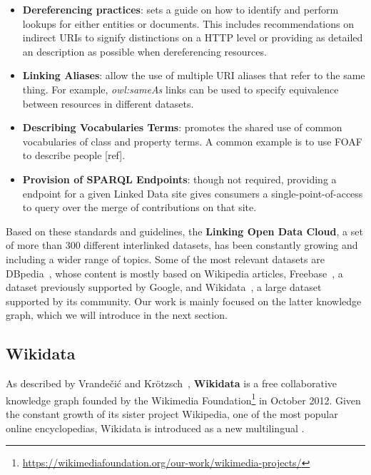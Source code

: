 \begin{itemize}
    \item \textbf{Dereferencing practices}: sets a guide on how to identify and perform lookups 
    for either entities or documents. This includes recommendations on indirect URIs to signify 
    distinctions on a HTTP level or providing as detailed an \RDF{} description as possible when 
    dereferencing resources. 
    \item \textbf{Linking Aliases}: allow the use of multiple URI aliases that refer to the same 
    thing. For example, \textit{owl:sameAs} links can be used to specify equivalence between 
    resources in different datasets.
    \item \textbf{Describing Vocabularies Terms}: promotes the shared use of common vocabularies 
    of class and property terms. A common example is to use FOAF to describe people [ref].
    \item \textbf{Provision of SPARQL Endpoints}: though not required, providing a \SPARQL{} endpoint 
    for a given Linked Data site gives consumers a single-point-of-access to query over the merge 
    of contributions on that site.
\end{itemize} %

Based on these standards and guidelines, the \textbf{Linking Open Data Cloud}, a set of more than 
300 different interlinked \RDF{} datasets, has been constantly growing and including a wider range of 
topics. Some of the most relevant datasets are DBpedia~\cite{KG:dbpedia}, whose content is mostly 
based on Wikipedia articles, Freebase~\cite{KG:freebase}, a dataset previously supported by Google, 
and Wikidata~\cite{KG:wikidata}, a large dataset supported by its community. Our work is mainly 
focused on the latter knowledge graph, which we will introduce in the next section.

\subsection{Wikidata}
\label{cap2:semWeb/wikidata}
As described by Vrandečić and Krötzsch~\cite{KG:wikidata}, \textbf{Wikidata} is a free 
collaborative knowledge graph founded by the Wikimedia Foundation\footnote{\url{https://wikimediafoundation.org/our-work/wikimedia-projects/}} 
in October 2012. Given the constant growth of its sister project Wikipedia, one of the most 
popular online encyclopedias, Wikidata is introduced as a new multilingual 
. 

